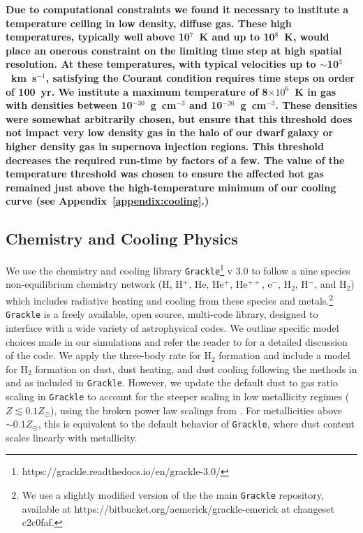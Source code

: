 \documentclass[fleqn,usenatbib,useAMS]{mnras}
\begin{document}
\textbf{Due to computational constraints we found it necessary to institute a temperature ceiling in low density, diffuse gas. These high temperatures, typically well above 10$^{7}$~K and up to 10$^{8}$~K, would place an onerous constraint on the limiting time step at high spatial resolution. At these temperatures, with typical velocities up to $\sim$10$^{3}$~km~s$^{-1}$, satisfying the Courant condition requires time steps on order of 100~yr. We institute a maximum temperature of 8$\times 10^6$~K in gas with densities between 10$^{-30}$~g~cm$^{-3}$ and 10$^{-26}$~g~cm$^{-3}$. These densities were somewhat arbitrarily chosen, but ensure that this threshold does not impact very low density gas in the halo of our dwarf galaxy or higher density gas in supernova injection regions. This threshold decreases the required run-time by factors of a few. The value of the temperature threshold was chosen to ensure the affected hot gas remained just above the high-temperature minimum of our cooling curve (see Appendix~\ref{appendix:cooling}.)}

\subsection{Chemistry and Cooling Physics}
\label{sec:chemistry}

We use the chemistry and cooling library \texttt{Grackle}\footnote{https://grackle.readthedocs.io/en/grackle-3.0/} v 3.0 to follow a nine species non-equilibrium chemistry network (H, H$^+$, He, He$^+$, He$^{++}$, e$^{-}$, H$_2$, H$^{-}$, and H$_{2}$) which includes radiative heating and cooling from these species and metals.\footnote{We use a slightly modified version of the the main \texttt{Grackle} repository, available at https://bitbucket.org/aemerick/grackle-emerick at changeset c2c0faf.} \texttt{Grackle} is a freely available, open source, multi-code library, designed to interface with a wide variety of astrophysical codes. We outline specific model choices made in our simulations and refer the reader to \citet{GrackleMethod} for a detailed discussion of the code. We apply the \citet{Glover2008} three-body rate for H$_{2}$ formation and include a model for H$_2$ formation on dust, dust heating, and dust cooling following the methods in \citet{2000ApJ...534..809O} and \citet{2005ApJ...626..627O} as included in \texttt{Grackle}. However, we update the default dust to gas ratio scaling in \texttt{Grackle} to account for the steeper scaling in low metallicity regimes ($Z \lesssim 0.1 Z_{\odot}$), using the broken power law scalings from \citet{Remy-Ruyer2014}. For metallicities above $\sim 0.1 Z_{\odot}$, this is equivalent to the default behavior of \texttt{Grackle}, where dust content scales linearly with metallicity.
\end{document}
